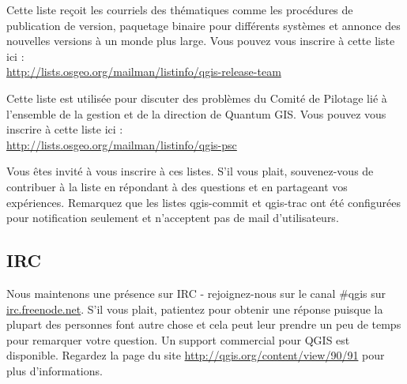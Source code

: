 Cette liste reçoit les courriels des thématiques comme les procédures de
publication de version, paquetage binaire pour différents systèmes et annonce
des nouvelles versions à un monde plus large. Vous pouvez vous inscrire à cette
liste ici :\\
\url{http://lists.osgeo.org/mailman/listinfo/qgis-release-team}

Cette liste est utilisée pour discuter des problèmes du Comité de Pilotage lié à
l'ensemble de la gestion et de la direction de Quantum GIS. Vous pouvez vous
inscrire à cette liste ici :\\
\url{http://lists.osgeo.org/mailman/listinfo/qgis-psc}

Vous êtes invité à vous inscrire à ces listes. S'il vous plait, souvenez-vous de
contribuer à la liste en répondant à des questions et en partageant vos
expériences. Remarquez que les listes qgis-commit et qgis-trac ont été
configurées pour notification seulement et n'acceptent pas de mail
d'utilisateurs.

\subsection{IRC}
Nous maintenons une présence sur IRC - rejoignez-nous sur le canal \#qgis sur
\url{irc.freenode.net}. S'il vous plait, patientez pour obtenir une réponse
puisque la plupart des personnes font autre chose et cela peut leur prendre un
peu de temps pour remarquer votre question. Un support commercial pour QGIS est
disponible. Regardez la page du site \url{http://qgis.org/content/view/90/91}
pour plus d'informations.

